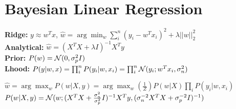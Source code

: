 \begin{comment}
	\pagebreak
\end{comment}

\section{Bayesian Linear Regression}
\begin{comment}
	\textbf{Goal:} Use data ($\cX \text{ } \cY$) to fit a function ($\cX \rightarrow \cY$).
	Use this function to predict unseen data.\\
\end{comment}

\textbf{Ridge:} $y \approx w^Tx$, $\hat{w} = \arg\min_w \sum_i^n(y_i - w^Tx_i)^2 + \lambda ||w||^2_2$\\
\textbf{Analytical:} $\hat{w} = (X^TX + \lambda I)^{-1} X^Ty$\\

\textbf{Prior:} $P(w) = \mathcal{N}(0,\sigma^2_p I)$ \\
\textbf{Lhood:} $P(y|w,x) = \prod_i^n P(y_i | w,x_i) = \prod_i^n \mathcal{N}(y_i; w^Tx_i, \sigma^2_n)$\\
\begin{comment}
In Bayes, we assume that y is not estimated as a single value, but drawn from a distribution.\\
\end{comment}

$\hat{w} = \arg\max_w P(w|X,y) = \arg\max_w (\frac{1}{Z}) P(w|X) \prod_i P(y_i|w,x_i)$\\

$P({w}|X,y) = \mathcal{N}({w}; (X^TX + \frac{\sigma_n^2}{\sigma_p^2}I)^{-1} X^Ty, (\sigma_n^{-2}X^TX + \sigma_p^{-2}I)^{-1})$\\
\begin{comment} 
	Assumes the weights to be Gaussian and the noise of the labels from $P(y|x,w)$ to be i.i.d. Gaussian.\\
	If we would not assume a prior, we would get the MLE, which are simply mean and variance of the given data (No regularization in Ridge regression).\\
	$\lambda$ is the ratio $\frac{\sigma^2_n}{\sigma^2_p}$ of noise in y to the variance of the weights \\
	\textbf{Derivation:} Maximize the posterior by using Bayes rule, Ridge regression $\Rightarrow$ MAP weight estimate.\\
	 Use the definition of P(w) and $P(y|w,x)$ and remove constants to derive ridge regression.\\
\end{comment}

